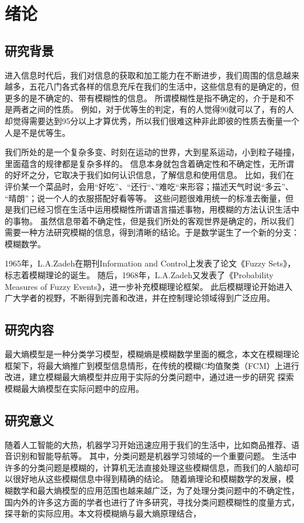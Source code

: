 \chapter[绪论]{绪论}
\section{研究背景}
\par
进入信息时代后，我们对信息的获取和加工能力在不断进步，我们周围的信息越来越多，五花八门各式各样的信息充斥在我们的生活中，这些信息有的是确定的，但更多的是不确定的、带有模糊性的信息。
所谓模糊性是指不确定的，介于是和不是两者之间的性质。
例如，对于优等生的判定，有的人觉得90就可以了，有的人却觉得需要达到95分以上才算优秀，所以我们很难这种非此即彼的性质去衡量一个人是不是优等生。
\par
我们所处的是一个复杂多变、时刻在运动的世界，大到星系运动，小到粒子碰撞，里面蕴含的规律都是复杂多样的。
信息本身就包含着确定性和不确定性，无所谓的好坏之分，它取决于我们如何认识信息，了解信息和使用信息。
比如，我们在评价某一个菜品时，会用“好吃”、“还行“、”难吃“来形容；描述天气时说“多云”、 “晴朗”；说一个人的衣服搭配好看等等。
这些问题很难用统一的标准去衡量，但是我们已经习惯在生活中运用模糊性所谓语言描述事物，用模糊的方法认识生活中的事物。
虽然信息带着不确定性，但是我们所处的客观世界是确定的，所以我们需要一种方法研究模糊的信息，得到清晰的结论。于是数学诞生了一个新的分支：模糊数学。
\par
1965年，L.A.Zadeh在期刊Information and Control上发表了论文《Fuzzy Sets》\cite{ZADEH1965fuzzy}，标志着模糊理论的诞生。
随后，1968年，L.A.Zadeh又发表了《Probability Measures of Fuzzy Events》\cite{zadeh1968probability}，进一步补充模糊理论框架。
此后模糊理论开始进入广大学者的视野，不断得到完善和改进，并在控制理论领域得到广泛应用。
\section{研究内容}
最大熵模型是一种分类学习模型，模糊熵是模糊数学里面的概念，本文在模糊理论框架下，将最大熵推广到模型信息情形，在传统的模糊C均值聚类（FCM）上进行改进，建立模糊最大熵模型并应用于实际的分类问题中，通过进一步的研究 探索模糊最大熵模型在实际问题中的应用。
\section{研究意义}
随着人工智能的大热，机器学习开始迅速应用于我们的生活中，比如商品推荐、语音识别和智能导航等。
其中，分类问题是机器学习领域的一个重要问题。
生活中许多的分类问题是模糊的，计算机无法直接处理这些模糊信息，而我们的人脑却可以很好地从这些模糊信息中得到精确的结论。
随着熵理论和模糊数学的发展，模糊数学和最大熵模型的应用范围也越来越广泛，为了处理分类问题中的不确定性，国内外的许多这方面的学者也进行了许多研究，寻找分类问题模糊性的度量方式，探寻新的实际应用。本文将模糊熵与最大熵原理结合，